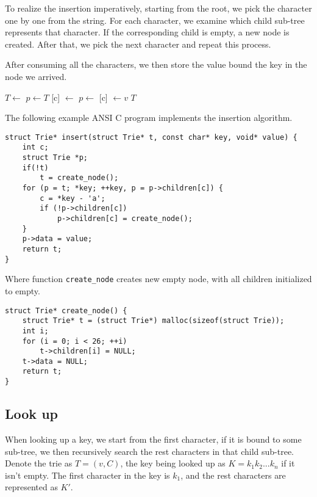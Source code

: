 \documentclass[b5paper]{article}
\begin{document}
To realize the insertion imperatively, starting from the root, we pick the character
one by one from the string. For each character, we examine which child sub-tree
represents that character. If the corresponding child is empty, a new node is
created. After that, we pick the next character and repeat this process.

After consuming all the characters, we then store the
value bound the key in the node we arrived.

\begin{algorithmic}[1]
    \State $T \gets $ 
  \EndIf
  \State $p \gets T$
      \State {}[c] $\gets$ 
    \EndIf
    \State $p \gets $ [c]
  \EndFor
  \State {} $\gets v$
  \State \Return $T$
\EndFunction
\end{algorithmic}

The following example ANSI C program implements the insertion algorithm.

\lstset{language=C}
\begin{lstlisting}
struct Trie* insert(struct Trie* t, const char* key, void* value) {
    int c;
    struct Trie *p;
    if(!t)
        t = create_node();
    for (p = t; *key; ++key, p = p->children[c]) {
        c = *key - 'a';
        if (!p->children[c])
            p->children[c] = create_node();
    }
    p->data = value;
    return t;
}
\end{lstlisting}

Where function \texttt{create\_node} creates new empty node, with all
children initialized to empty.

\begin{lstlisting}
struct Trie* create_node() {
    struct Trie* t = (struct Trie*) malloc(sizeof(struct Trie));
    int i;
    for (i = 0; i < 26; ++i)
        t->children[i] = NULL;
    t->data = NULL;
    return t;
}
\end{lstlisting}

\subsection{Look up}

When looking up a key, we start from the first character,
if it is bound to some sub-tree, we then
recursively search the rest characters in that child sub-tree.
Denote the trie as $T = (v, C)$, the key being looked up as
$K = k_1k_2...k_n$ if it isn't empty. The first character in
the key is $k_1$, and the rest characters are represented as $K'$.
\end{document}
